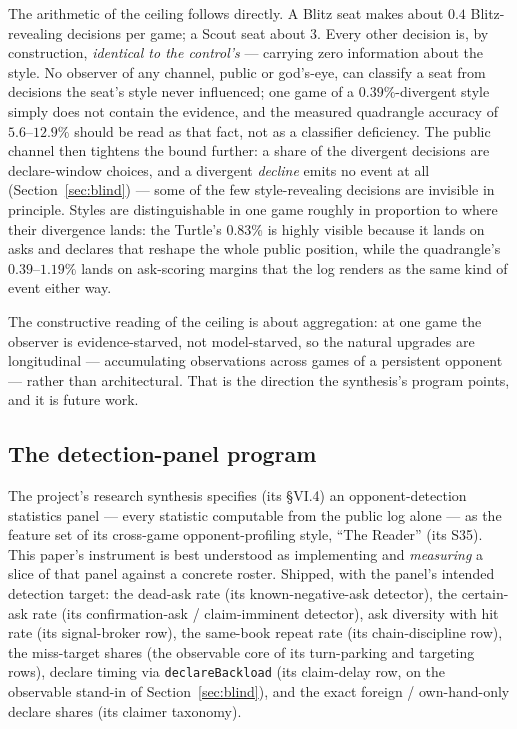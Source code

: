 \documentclass[11pt]{article}
\newcommand{\code}[1]{\texttt{#1}}
\begin{document}
The arithmetic of the ceiling follows directly. A Blitz seat makes about $0.4$
Blitz-revealing decisions per game; a Scout seat about $3$. Every other decision is, by
construction, \emph{identical to the control's} --- carrying zero information about the
style. No observer of any channel, public or god's-eye, can classify a seat from decisions
the seat's style never influenced; one game of a $0.39\%$-divergent style simply does not
contain the evidence, and the measured quadrangle accuracy of $5.6$--$12.9\%$ should be read
as that fact, not as a classifier deficiency. The public channel then tightens the bound
further: a share of the divergent decisions are declare-window choices, and a divergent
\emph{decline} emits no event at all (Section~\ref{sec:blind}) --- some of the few
style-revealing decisions are invisible in principle. Styles are distinguishable in one game
roughly in proportion to where their divergence lands: the Turtle's $0.83\%$ is highly
visible because it lands on asks and declares that reshape the whole public position, while
the quadrangle's $0.39$--$1.19\%$ lands on ask-scoring margins that the log renders as the
same kind of event either way.

The constructive reading of the ceiling is about aggregation: at one game the observer is
evidence-starved, not model-starved, so the natural upgrades are longitudinal ---
accumulating observations across games of a persistent opponent --- rather than
architectural. That is the direction the synthesis's program points, and it is future work.

\subsection{The detection-panel program}

The project's research synthesis \cite{playstyles} specifies (its \S VI.4) an
opponent-detection statistics panel --- every statistic computable from the public log alone
--- as the feature set of its cross-game opponent-profiling style, ``The Reader'' (its S35).
This paper's instrument is best understood as implementing and \emph{measuring} a slice of
that panel against a concrete roster. Shipped, with the panel's intended detection target:
the dead-ask rate (its known-negative-ask detector), the certain-ask rate (its
confirmation-ask / claim-imminent detector), ask diversity with hit rate (its signal-broker
row), the same-book repeat rate (its chain-discipline row), the miss-target shares (the
observable core of its turn-parking and targeting rows), declare timing via
\code{declareBackload} (its claim-delay row, on the observable stand-in of
Section~\ref{sec:blind}), and the exact foreign / own-hand-only declare shares (its claimer
taxonomy).
\end{document}
